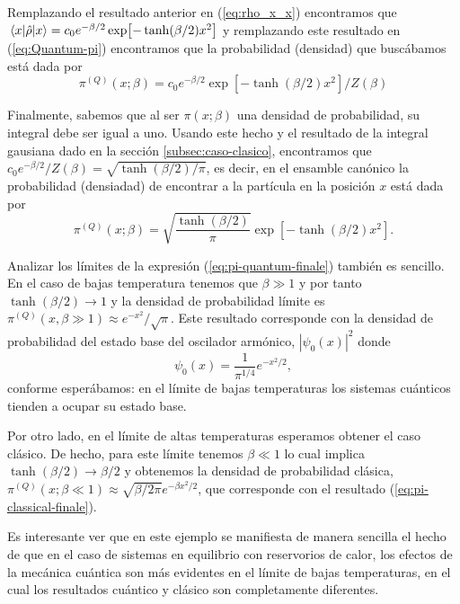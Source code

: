 \documentclass[%
 reprint,
 amsmath,amssymb,
 aps,
 pra,
]{revtex4-2}
\begin{document}
Remplazando el resultado anterior en  (\ref{eq:rho_x_x}) encontramos que $\ev{\hat{\rho}}{x}= c_0e^{-\beta/2}\exp[-\tanh(\beta/2)x^2]$ y remplazando este resultado en (\ref{eq:Quantum-pi}) encontramos que la probabilidad (densidad) que buscábamos está dada por
\begin{equation}
	\pi^{(Q)}(x;\beta) = c_0e^{-\beta/2}\exp[-\tanh(\beta/2)x^2]/Z(\beta)
\end{equation}

Finalmente, sabemos que al ser $\pi(x;\beta)$ una densidad de probabilidad, su integral debe ser igual a uno. Usando este hecho y el resultado de la integral gausiana dado en la sección \ref{subsec:caso-clasico}, encontramos que $c_0 e^{-\beta/2}/Z(\beta)=\sqrt{\tanh(\beta/2)/\pi}$, es decir, en el ensamble canónico la probabilidad (densiadad) de encontrar a la partícula en la posición $x$ está dada por
\begin{equation}
	\pi^{(Q)}(x;\beta) = \sqrt{\frac{\tanh(\beta/2)}{\pi}}\exp[-\tanh(\beta/2)x^2]. \label{eq:pi-quantum-finale}
\end{equation}


Analizar los límites de la expresión (\ref{eq:pi-quantum-finale}) también es sencillo. En el caso de bajas temperatura tenemos que $\beta \gg 1$ y por tanto $\tanh(\beta/2)\rightarrow 1$ y la densidad de probabilidad límite es $\pi^{(Q)}(x,\beta\gg 1) \approx e^{-x^2}/\sqrt{\pi}$. Este resultado corresponde con la densidad de probabilidad del estado base del oscilador armónico, $|\psi_0(x)|^2$  donde 
\begin{equation}
	\psi_0(x) = \frac{1}{\pi^{1/4}} e^{-x^2/2},	\label{eq:QHO-ground-state}
\end{equation}
conforme esperábamos: en el límite de bajas temperaturas los sistemas cuánticos tienden a ocupar su estado base.

Por otro lado, en el límite de altas temperaturas esperamos obtener el caso clásico. De hecho, para este límite tenemos $\beta \ll 1$ lo cual implica $\tanh(\beta/2)\rightarrow\beta/2$ y obtenemos la densidad de probabilidad clásica, $\pi^{(Q)}(x;\beta \ll 1) \approx \sqrt{\beta/2\pi}e^{-\beta x^2/2}$, que corresponde con el resultado (\ref{eq:pi-classical-finale}).

Es interesante ver que en este ejemplo se manifiesta de manera sencilla el hecho de que en el caso de sistemas en equilibrio con reservorios de calor, los efectos de la mecánica cuántica son más evidentes en el límite de bajas temperaturas, en el cual los resultados cuántico y clásico son completamente diferentes.
\end{document}
